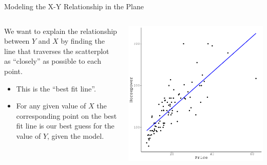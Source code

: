 \documentclass[10pt]{beamer}\usepackage[]{graphicx}\usepackage[]{color}
\makeatletter
\def\maxwidth{ %
  \ifdim\Gin@nat@width>\linewidth
    \linewidth
  \else
    \Gin@nat@width
  \fi
}
\newenvironment{knitrout}{}{} %
\makeatother
\begin{document}

\begin{frame}{Modeling the X-Y Relationship in the Plane}

  \begin{columns}
    \begin{column}{0.5\textwidth}
      We want to explain the relationship between $Y$ and $X$ by finding the
      line that traverses the scatterplot as ``closely'' as possible to each
      point.
      \vb
      \begin{itemize}
      \item This is the ``best fit line''.
        \vb
      \item For any given value of $X$ the corresponding point on the best fit
        line is our best guess for the value of $Y$, given the model.
      \end{itemize}
    \end{column}

    \begin{column}{0.5\textwidth}

\begin{knitrout}\footnotesize
{}\color{fgcolor}

{\centering \includegraphics[width=\maxwidth]{figure/unnamed-chunk-4-1} 

}


\end{knitrout}

\end{column}
\end{columns}

\end{frame}
\end{document}
